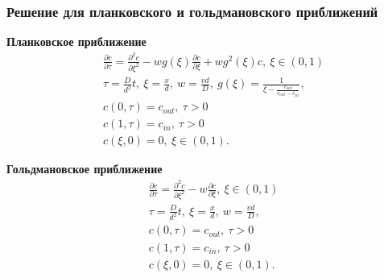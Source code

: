 \documentclass[10pt,pdf]{beamer}
\newcommand{\pder}[2] {\frac{\partial #1}{\partial #2}}
\newcommand{\ppder}[2]{\frac{\partial^2 #1}{\partial {#2}^2}}
\begin{document}
  \begin{frame}
      \frametitle{Решение для планковского и гольдмановского приближений}

      \begin{minipage}{.47\textwidth}
      \textbf{Планковское приближение}
          \begingroup
\everymath{\scriptstyle}
\scriptsize
        \begin{align*}
        & \pder{c}{\tau} = \ppder{c}{\xi} - wg(\xi)\pder{c}{\xi} + wg^2(\xi)c,
            \ \xi\in(0,1) \\
        & \tau = \frac{D}{d^2}t,\ \xi = \frac{x}{d},\ w = \frac{vd}{D},
        \ g(\xi) = \frac{1}{\xi - \frac{c_{out}}{c_{out} - c_{in}}},\\
        & c(0, \tau) = c_{out},\ \tau>0 \\
        & c(1, \tau) = c_{in},\ \tau>0 \\
        & c(\xi, 0) = 0,\ \xi\in(0,1).
    \end{align*}
\endgroup
\end{minipage}\hfill
      \begin{minipage}{.47\textwidth}
      \textbf{Гольдмановское приближение}
\begingroup
\everymath{\scriptstyle}
\scriptsize
        \begin{align*}
            & \pder{c}{\tau} = \ppder{c}{\xi} -
                w\pder{c}{\xi},\ \xi\in(0,1) \\
            & \tau = \frac{D}{d^2}t,\ \xi = \frac{x}{d},\ w = \frac{vd}{D},\\
            & c(0, \tau) = c_{out},\ \tau>0 \\
            & c(1, \tau) = c_{in},\ \tau>0 \\
            & c(\xi, 0) = 0,\ \xi\in(0,1).
        \end{align*}
\endgroup
    \end{minipage}\hfill
\end{frame}
\end{document}
